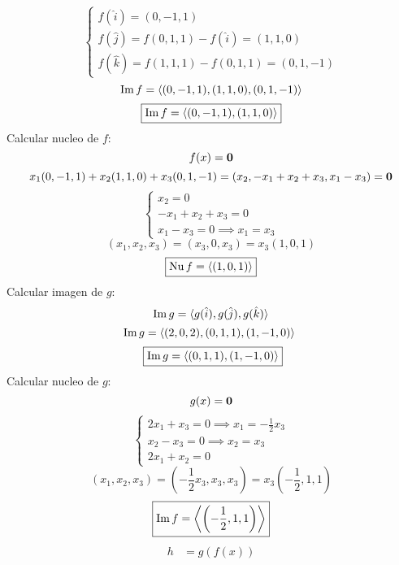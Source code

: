 \documentclass[../practica.root.tex]{subfiles}
\begin{document}
\begin{enumerate}
\begin{enumerate}
\[\begin{cases}
                            f(\hat{i}) = (0, -1, 1)                      \\
                            f(\hat{j}) = f(0,1,1)-f(\hat{i}) = (1, 1, 0) \\
                            f(\hat{k}) = f(1,1,1)-f(0,1,1) = (0,1,-1)
                        \end{cases}
                    \] \[
                        \operatorname{Im} f = \langle (0,-1,1),(1,1,0),(0,1,-1) \rangle
                    \] \[
                        \boxed{\operatorname{Im} f = \langle (0,-1,1),(1,1,0) \rangle}
                    \]
                    Calcular nucleo de \(f\):
                    \[ f(x) = \mathbf{0} \]
                    \[ x_1(0,-1,1) + x_2(1,1,0) + x_3(0,1,-1) = (x_2,-x_1+x_2+x_3,x_1-x_3) = \mathbf{0} \]
                    \[
                        \begin{cases}
                            x_2 = 0              \\
                            -x_1 + x_2 + x_3 = 0 \\
                            x_1 - x_3 = 0 \implies x_1 = x_3
                        \end{cases}
                    \]
                    \[ (x_1,x_2,x_3) = (x_3,0,x_3) = x_3(1,0,1) \]
                    \[ \boxed{\operatorname{Nu} f = \langle (1,0,1) \rangle} \]
                    Calcular imagen de \(g\):
                    \[ \operatorname{Im} g = \langle g(\hat{i}),g(\hat{j}),g(\hat{k}) \rangle \]
                    \[ \Img g = \langle (2,0,2),(0,1,1),(1,-1,0) \rangle \]
                    \[ \boxed{\Img g = \langle (0,1,1),(1,-1,0) \rangle} \]
                    Calcular nucleo de \(g\):
                    \[
                        g(x) = \mathbf{0}
                    \] \[
                        \begin{cases}
                            2x_1 + x_3 = 0 \implies x_1 = -\frac{1}{2}x_3 \\
                            x_2 - x_3 = 0 \implies x_2 = x_3              \\
                            2x_1 + x_2 = 0
                        \end{cases}
                    \] \[
                        (x_1, x_2, x_3) = \left(-\frac{1}{2}x_3, x_3, x_3\right) = x_3\left(-\frac{1}{2},1,1\right)
                    \] \[
                        \boxed{\operatorname{Im} f = \left\langle \left(-\frac{1}{2},1,1\right) \right\rangle }
                    \]
                    \begin{align*}
                        h & = g(f(x))                                                        \\

\end{align*}
\end{enumerate}
\end{enumerate}
\end{document}
